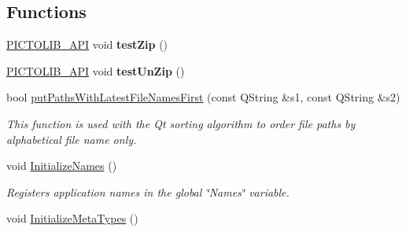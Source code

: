 \subsection*{Functions}
\begin{DoxyCompactItemize}
\item 
\hypertarget{namespace_picto_a05442fd4e9ee1b91e51f59253b29c354}{\hyperlink{common_8h_a2cae29357e9e9871ba22bbfc2a35b0e2}{P\-I\-C\-T\-O\-L\-I\-B\-\_\-\-A\-P\-I} void {\bfseries test\-Zip} ()}\label{namespace_picto_a05442fd4e9ee1b91e51f59253b29c354}

\item 
\hypertarget{namespace_picto_a6e506891cfec2cee12d6c3312348923f}{\hyperlink{common_8h_a2cae29357e9e9871ba22bbfc2a35b0e2}{P\-I\-C\-T\-O\-L\-I\-B\-\_\-\-A\-P\-I} void {\bfseries test\-Un\-Zip} ()}\label{namespace_picto_a6e506891cfec2cee12d6c3312348923f}

\item 
\hypertarget{namespace_picto_a6cfd38097425af504c3b49ef3b9fdea9}{bool \hyperlink{namespace_picto_a6cfd38097425af504c3b49ef3b9fdea9}{put\-Paths\-With\-Latest\-File\-Names\-First} (const Q\-String \&s1, const Q\-String \&s2)}\label{namespace_picto_a6cfd38097425af504c3b49ef3b9fdea9}

\begin{DoxyCompactList}\small\item\em This function is used with the Qt sorting algorithm to order file paths by alphabetical file name only. \end{DoxyCompactList}\item 
\hypertarget{namespace_picto_afdd009fc47ba59833c3c368b398be84f}{void \hyperlink{namespace_picto_afdd009fc47ba59833c3c368b398be84f}{Initialize\-Names} ()}\label{namespace_picto_afdd009fc47ba59833c3c368b398be84f}

\begin{DoxyCompactList}\small\item\em Registers application names in the global \char`\"{}\-Names\char`\"{} variable. \end{DoxyCompactList}\item 
\hypertarget{namespace_picto_af8ad28d4bf25d2fb345491568c52798c}{void \hyperlink{namespace_picto_af8ad28d4bf25d2fb345491568c52798c}{Initialize\-Meta\-Types} ()}\label{namespace_picto_af8ad28d4bf25d2fb345491568c52798c}


\end{DoxyCompactItemize}
